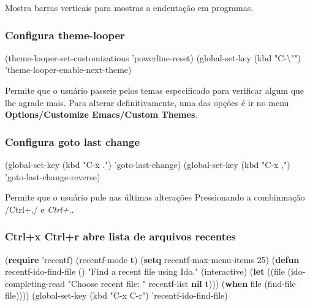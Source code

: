 \documentclass[]{article}
\newenvironment{Shaded}{}{}
\newcommand{\KeywordTok}[1]{\textcolor[rgb]{0.00,0.44,0.13}{\textbf{{#1}}}}
\newcommand{\DecValTok}[1]{\textcolor[rgb]{0.25,0.63,0.44}{{#1}}}
\newcommand{\StringTok}[1]{\textcolor[rgb]{0.25,0.44,0.63}{{#1}}}
\newcommand{\FunctionTok}[1]{\textcolor[rgb]{0.02,0.16,0.49}{{#1}}}
\newcommand{\NormalTok}[1]{{#1}}
\begin{document}
Mostra barras verticais para mostras a endentação em programas.

\subsubsection{Configura theme-looper}\label{configura-theme-looper}

\begin{Shaded}
\begin{Highlighting}[]
\NormalTok{(theme-looper-set-customizations 'powerline-reset)}
\NormalTok{(global-set-key (kbd }\StringTok{"C-}\NormalTok{\textbackslash{}"}\StringTok{"}\NormalTok{) 'theme-looper-enable-next-theme)}
\end{Highlighting}
\end{Shaded}

Permite que o usuário passeie pelos temas especificado para verificar
algum que lhe agrade mais. Para alterar definitivamente, uma das opções
é ir no menu \textbf{Options/Customize Emacs/Custom Themes}.

\subsubsection{Configura goto last
change}\label{configura-goto-last-change}

\begin{Shaded}
\begin{Highlighting}[]
\NormalTok{(global-set-key (kbd }\StringTok{"C-x ."}\NormalTok{) 'goto-last-change)}
\NormalTok{(global-set-key (kbd }\StringTok{"C-x ,"}\NormalTok{) 'goto-last-change-reverse)}
\end{Highlighting}
\end{Shaded}

Permite que o usuário pule nas últimas alterações Pressionando a
combinmação /Ctrl+,/ e \emph{Ctrl+.}.

\subsubsection{Ctrl+x Ctrl+r abre lista de arquivos
recentes}\label{ctrlx-ctrlr-abre-lista-de-arquivos-recentes}

\begin{Shaded}
\begin{Highlighting}[]
\NormalTok{(}\KeywordTok{require} \NormalTok{'recentf)}
\NormalTok{(recentf-mode }\KeywordTok{t}\NormalTok{)}
\NormalTok{(}\KeywordTok{setq} \NormalTok{recentf-max-menu-items }\DecValTok{25}\NormalTok{)}
\NormalTok{(}\KeywordTok{defun}\FunctionTok{ recentf-ido-find-file }\NormalTok{()}
  \StringTok{"Find a recent file using Ido."}
  \NormalTok{(interactive)}
  \NormalTok{(}\KeywordTok{let} \NormalTok{((file (ido-completing-read }\StringTok{"Choose recent file: "}
    \NormalTok{recentf-list }\KeywordTok{nil} \KeywordTok{t}\NormalTok{)))}
    \NormalTok{(}\KeywordTok{when} \NormalTok{file}
      \NormalTok{(find-file file))))}
\NormalTok{(global-set-key (kbd }\StringTok{"C-x C-r"}\NormalTok{) 'recentf-ido-find-file)}
\end{Highlighting}
\end{Shaded}
\end{document}
